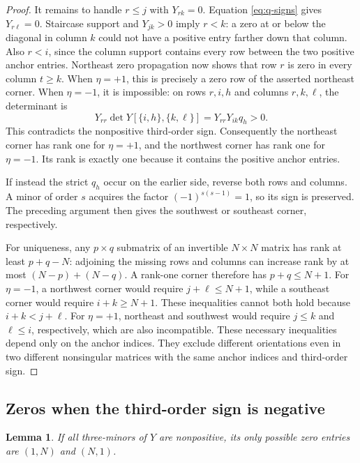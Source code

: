 \documentclass[10pt,a4paper]{article}
\newtheorem{lemma}[theorem]{Lemma}
\theoremstyle{definition}
\theoremstyle{remark}
\numberwithin{equation}{section}
\begin{document}
\begin{proof}
It remains to handle $r\leq j$ with $Y_{rk}=0$. Equation
\eqref{eq:q-signs} gives $Y_{r\ell}=0$. Staircase support and
$Y_{jk}>0$ imply $r<k$: a zero at or below the diagonal in column
$k$ could not have a positive entry farther down that column.
Also $r<i$, since the column support contains every row between the
two positive anchor entries. Northeast zero propagation now shows
that row $r$ is zero in every column $t\geq k$. When $\eta=+1$,
this is precisely a zero row of the asserted northeast corner.
When $\eta=-1$, it is impossible: on rows $r,i,h$ and columns
$r,k,\ell$, the determinant is
\[
 Y_{rr}\det Y[\{i,h\},\{k,\ell\}]
 =Y_{rr}Y_{ik}q_h>0.
\]
This contradicts the nonpositive third-order sign.
Consequently the northeast corner has rank one for $\eta=+1$, and
the northwest corner has rank one for $\eta=-1$. Its rank is exactly
one because it contains the positive anchor entries.

If instead the strict $q_h$ occur on the earlier side, reverse both
rows and columns. A minor of order $s$ acquires the factor
$(-1)^{s(s-1)}=1$, so its sign is preserved. The preceding argument
then gives the southwest or southeast corner, respectively.

For uniqueness, any $p\times q$ submatrix of an invertible
$N\times N$ matrix has rank at least $p+q-N$: adjoining the missing
rows and columns can increase rank by at most $(N-p)+(N-q)$.
A rank-one corner therefore has $p+q\leq N+1$. For $\eta=-1$,
a northwest corner would require $j+\ell\leq N+1$, while a southeast
corner would require $i+k\geq N+1$. These inequalities cannot both
hold because $i+k<j+\ell$. For $\eta=+1$, northeast and southwest
would require $j\leq k$ and $\ell\leq i$, respectively, which are
also incompatible. These necessary inequalities depend only on the
anchor indices. They exclude different orientations even in two
different nonsingular matrices with the same anchor indices and
third-order sign.
\end{proof}

\subsection{Zeros when the third-order sign is negative}

\begin{lemma}\label{lem:twozeros}
If all three-minors of $Y$ are nonpositive, its only possible zero
entries are $(1,N)$ and $(N,1)$.
\end{lemma}
\end{document}
